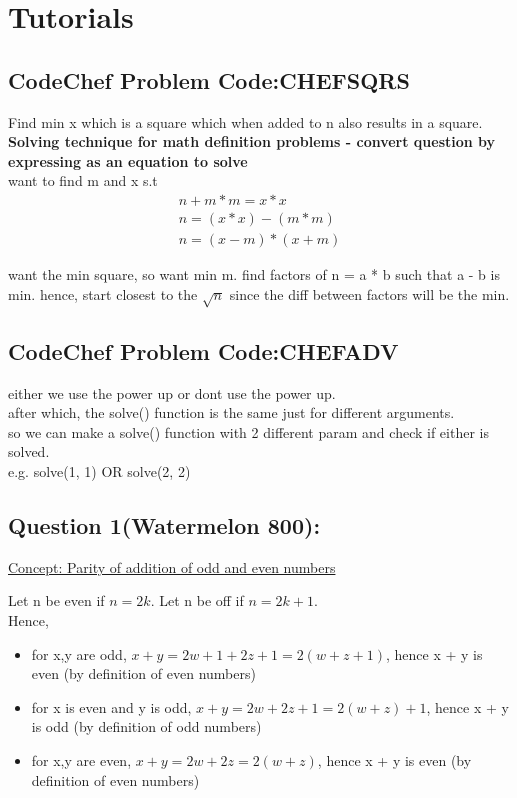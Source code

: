 \documentclass[12pt]{article}
\begin{document}
\section{Tutorials} 

\subsection{CodeChef Problem Code:CHEFSQRS}
Find min x which is a square which when added to n also results in a square. \\ [\baselineskip] 

{\textbf{Solving technique for math definition problems - convert question by expressing as an equation to solve}} \\
want to find m and x s.t 
\begin{align}
	n + m * m = x * x \\
	n = (x * x) - (m * m) \\
	n = (x - m) * (x + m) 
 \end{align} 
 
 want the min square, so want min m. 
 find factors of n = a * b such that a - b is min. 
 hence, start closest to the \(\sqrt{n}\) since the diff between factors will be the min. 
 
 \subsection{CodeChef Problem Code:CHEFADV} 
 either we use the power up or dont use the power up. \\
 after which, the solve() function is the same just for different arguments. \\
 so we can make a solve() function with 2 different param and check if either is solved. \\
 e.g. solve(1, 1) OR solve(2, 2)

\subsection{Question 1(Watermelon 800):}  

{\underline{Concept: Parity of addition of odd and even numbers}}  

Let n be even if \( n = 2k \). 
Let n be off if \( n = 2k + 1 \). \\ [\baselineskip]

Hence, 

\begin{itemize} 
	\item for x,y are odd, \(x + y = 2w + 1 + 2z + 1 = 2(w + z + 1)\), hence x + y is even (by definition of even numbers) 
	\item for x is even and y is odd, \( x + y = 2w + 2z + 1 = 2(w + z) + 1\), hence x + y is odd (by definition of odd numbers) 
	\item for x,y are even, \( x + y = 2w + 2z = 2(w + z)\), hence x + y is even (by definition of even numbers) \\ [\baselineskip]
 \end{itemize} 
 
\end{document}
